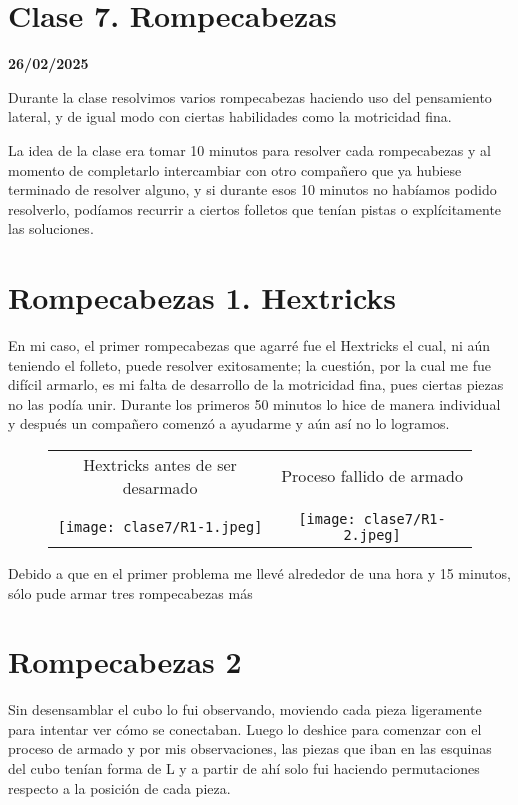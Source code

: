 \section{Clase 7. Rompecabezas}
\textbf{26/02/2025}

Durante la clase resolvimos varios rompecabezas haciendo uso del pensamiento lateral, y de igual modo con ciertas habilidades como la motricidad fina. 

La idea de la clase era tomar 10 minutos para resolver cada rompecabezas y al momento de completarlo intercambiar con otro compañero que ya hubiese terminado de resolver alguno, y si durante esos 10 minutos no habíamos podido resolverlo, podíamos recurrir a ciertos folletos que tenían pistas o explícitamente las soluciones. 

\section{Rompecabezas 1. Hextricks}

En mi caso, el primer rompecabezas que agarré fue el Hextricks el cual, ni aún teniendo el folleto, puede resolver exitosamente; la cuestión, por la cual me fue difícil armarlo, es mi falta de desarrollo de la motricidad fina, pues ciertas piezas no las podía unir. Durante los primeros 50 minutos lo hice de manera individual y después un compañero comenzó a ayudarme y aún así no lo logramos.

\begin{figure}[H]
    \begin{tabular}{cc}
        Hextricks antes de ser desarmado & Proceso fallido de armado\\\\
        \texttt{[image: clase7/R1-1.jpeg]}&\texttt{[image: clase7/R1-2.jpeg]}
    \end{tabular}
    \caption{}
\end{figure}

Debido a que en el primer problema me llevé alrededor de una hora y 15 minutos, sólo pude armar tres rompecabezas más

\section{Rompecabezas 2}

Sin desensamblar el cubo lo fui observando, moviendo cada pieza ligeramente para intentar ver cómo se conectaban. Luego lo deshice para comenzar con el proceso de armado y por mis observaciones, las piezas que iban en las esquinas del cubo tenían forma de L y a partir de ahí solo fui haciendo permutaciones respecto a la posición de cada pieza.


